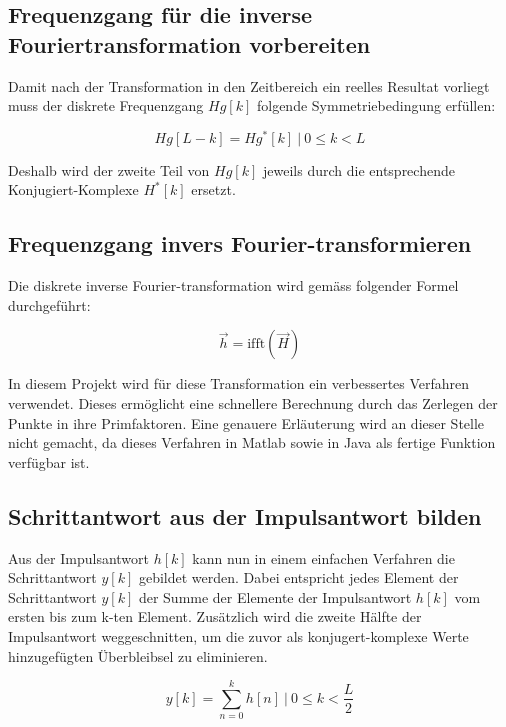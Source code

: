 \subsection{Frequenzgang f\"ur die inverse Fouriertransformation vorbereiten}
Damit nach der Transformation in den Zeitbereich ein reelles Resultat vorliegt
muss der diskrete Frequenzgang $Hg[k]$ folgende Symmetriebedingung erf\"ullen:

\begin{equation*}
    Hg[L-k]=Hg^*[k]  ~|~ 0 \leq k < L
\end{equation*}

Deshalb  wird der  zweite Teil  von  $Hg[k]$ jeweils  durch die  entsprechende
Konjugiert-Komplexe  $H^*[k]$ ersetzt.



\subsection{Frequenzgang invers Fourier-transformieren}
Die  diskrete inverse  Fourier-transformation wird  gem\"ass folgender  Formel
durchgef\"uhrt:

\begin{equation*}
    \vec{h}=\text{ifft}(\vec{H})
\end{equation*}


In diesem Projekt  wird f\"ur diese Transformation  ein verbessertes Verfahren
verwendet. Dieses erm\"oglicht  eine schnellere Berechnung durch  das Zerlegen
der Punkte  in ihre Primfaktoren. Eine  genauere Erl\"auterung wird  an dieser
Stelle nicht gemacht, da dieses Verfahren  in Matlab sowie in Java als fertige
Funktion verf\"ugbar ist.



\subsection{Schrittantwort aus der Impulsantwort bilden}
Aus  der  Impulsantwort $h[k]$  kann  nun  in  einem einfachen  Verfahren  die
Schrittantwort  $y[k]$ gebildet  werden.  Dabei  entspricht jedes  Element der
Schrittantwort  $y[k]$ der  Summe der  Elemente der  Impulsantwort $h[k]$  vom
ersten  bis zum  k-ten Element.   Zus\"atzlich  wird die  zweite H\"alfte  der
Impulsantwort  weggeschnitten,  um  die  zuvor  als  konjugert-komplexe  Werte
hinzugef\"ugten \"Uberbleibsel zu eliminieren.

\begin{equation*}
    y[k]= \sum_{n=0}^k h[n] ~|~ 0 \leq k < \frac{L}{2}
\end{equation*}
